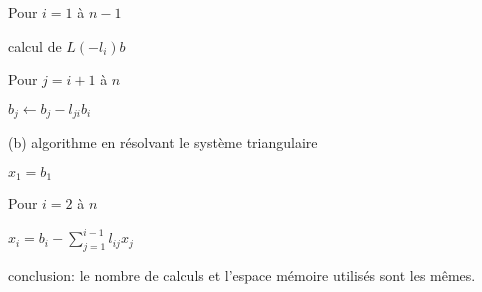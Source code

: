 {\begin{enumerate}
{Pour $i=1$ \`a $n-1$

\hspace{2cm} calcul de $L(-l_i)b$

\hspace{3cm} Pour $j=i+1$ \`a $n$

\hspace{4cm} $b_j\leftarrow b_j-l_{ji}b_i$


(b) algorithme en r\'esolvant le syst\`eme triangulaire

$x_1 =b_1$

Pour $i=2$ \`a $n$ 

\hspace{2cm}$x_i=b_i-\sum_{j=1}^{i-1}l_{ij}x_j$


conclusion: le nombre de calculs et l'espace m\'emoire utilis\'es sont les m\^emes.}
\end{enumerate}
}